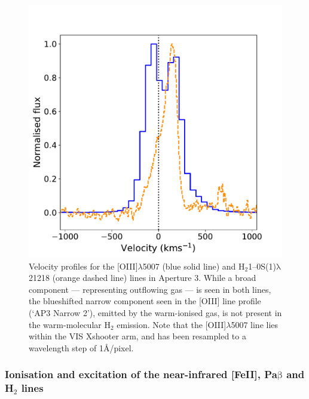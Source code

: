 \begin{figure}[!ht]
	\centering
	\includegraphics[width=0.7\linewidth]{figures/xshooter_ic5063/ap3_oiii_h2.pdf}
	\caption[Velocity profiles of for the {[}OIII{]}$\lambda$5007 and H$_2$1--0S(1)$\mathrm{\lambda}$21218 lines at the position of the SE radio lobe of IC.]{Velocity profiles for the [OIII]$\lambda$5007 (blue solid line) and \mbox{H$_2$1--0S(1)$\mathrm{\lambda}$21218} (orange dashed line) lines in Aperture 3. While a broad component --- representing outflowing gas --- is seen in both lines, the blueshifted narrow component seen in the [OIII] line profile (`AP3 Narrow 2'), emitted by the warm-ionised gas, is not present in the warm-molecular H$_2$ emission. Note that the [OIII]$\lambda$5007 line lies within the VIS Xshooter arm, and has been resampled to a wavelength step of 1\AA/pixel.}
	\label{fig: xshooter_ic5063: ap3_oiii_h2}
\end{figure}

\subsubsection{Ionisation and excitation of the near-infrared [FeII], Pa$\mathrm{\beta}$ and H$_2$ lines}
\label{section: xshooter_ic5063: properties_of_outflowing_gas: nir_analysis_and_results: excitation}

